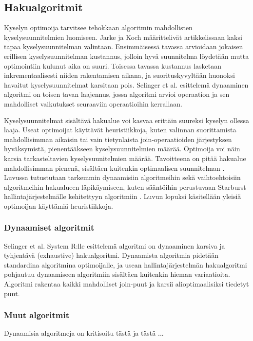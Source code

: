 \documentclass[finnish]{tktltiki2}
\theoremstyle{definition}
\theoremstyle{remark}
\begin{document}
\subsection{Hakualgoritmit}
Kyselyn optimoija tarvitsee tehokkaan algoritmin mahdollisten kyselysuunnitelmien luomiseen. Jarke ja Koch määrittelivät artikkelissaan \cite{jarke1984} kaksi tapaa kyselysuunnitelman valintaan. Ensimmäisessä tavassa arvioidaan jokaisen erillisen kyselysuunnitelman kustannus, jolloin hyvä suunnitelma löydetään mutta optimointiin kulunut aika on suuri. Toisessa tavassa kustannus lasketaan inkrementaalisesti niiden rakentamisen aikana, ja suorituskyvyltään huonoksi havaitut kyselysuunnitelmat karsitaan pois. Selinger et al. esittelemä dynaaminen algoritmi \cite{selinger1979access} on toisen tavan laajennus, jossa algoritmi arvioi operaation ja sen mahdolliset vaikutukset seuraaviin operaatioihin kerrallaan. 

Kyselysuunnitelmat sisältävä hakualue voi kasvaa erittäin suureksi kyselyn ollessa laaja. Useat optimoijat käyttävät heuristiikkoja, kuten valinnan suorittamista mahdollisimman aikaisin tai vain tietynlaista join-operaatioiden järjestyksen hyväksymistä, pienentääkseen kyselysuunnitelmien määrää. Optimoija voi näin karsia tarkasteltavien kyselysuunitelmien määrää. Tavoitteena on pitää hakualue mahdollisimman pienenä, sisältäen kuitenkin optimaalisen suunnitelman \cite{jarke1984}. Luvussa tutustutaan tarkemmin dynaamisiin algoritmeihin sekä vaihtoehtoisiin algoritmeihin hakualueen läpikäymiseen, kuten sääntöihin perustuvaan Starburst-hallintajärjestelmälle kehitettyyn algoritmiin \cite{lohman1988grammar}. Luvun lopuksi käsitellään yleisiä optimoijan käyttämiä heuristiikkoja.

\subsubsection{Dynaamiset algoritmit}
Selinger et al. System R:lle esittelemä algoritmi on dynaaminen karsiva ja tyhjentävä (exhaustive) hakualgoritmi. Dynaamista algoritmia pidetään standardina algoritmina optimoijalle, ja usean hallintajärjestelmän hakualgoritmi pohjautuu dynaamiseen algoritmiin sisältäen kuitenkin hieman variaatioita. Algoritmi rakentaa kaikki mahdolliset join-puut ja karsii alioptimaalisiksi tiedetyt puut.
\subsubsection{Muut algoritmit}
Dynaamisia algoritmeja on kritisoitu tästä ja tästä \cite{tähän}...
\end{document}

